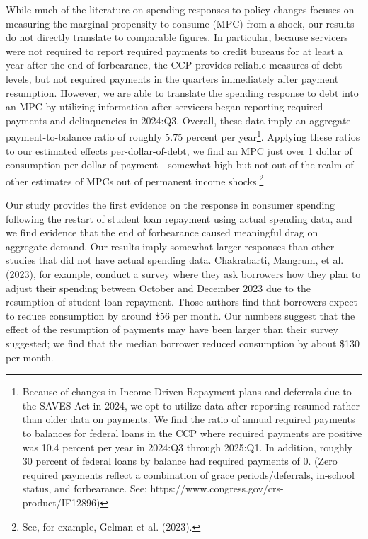 \documentclass[
  letterpaper,
  DIV=11,
  numbers=noendperiod]{scrartcl}
\begin{document}
While much of the literature on spending responses to policy changes
focuses on measuring the marginal propensity to consume (MPC) from a
shock, our results do not directly translate to comparable figures. In
particular, because servicers were not required to report required
payments to credit bureaus for at least a year after the end of
forbearance, the CCP provides reliable measures of debt levels, but not
required payments in the quarters immediately after payment resumption.
However, we are able to translate the spending response to debt into an
MPC by utilizing information after servicers began reporting required
payments and delinquencies in 2024:Q3. Overall, these data imply an
aggregate payment-to-balance ratio of roughly 5.75 percent per
year\footnote{Because of changes in Income Driven Repayment plans and
  deferrals due to the SAVES Act in 2024, we opt to utilize data after
  reporting resumed rather than older data on payments. We find the
  ratio of annual required payments to balances for federal loans in the
  CCP where required payments are positive was 10.4 percent per year in
  2024:Q3 through 2025:Q1. In addition, roughly 30 percent of federal
  loans by balance had required payments of 0. (Zero required payments
  reflect a combination of grace periods/deferrals, in-school status,
  and forbearance. See: https://www.congress.gov/crs-product/IF12896)}.
Applying these ratios to our estimated effects per-dollar-of-debt, we
find an MPC just over 1 dollar of consumption per dollar of
payment---somewhat high but not out of the realm of other estimates of
MPCs out of permanent income shocks.\footnote{See, for example, Gelman
  et al. (2023).}

Our study provides the first evidence on the response in consumer
spending following the restart of student loan repayment using actual
spending data, and we find evidence that the end of forbearance caused
meaningful drag on aggregate demand. Our results imply somewhat larger
responses than other studies that did not have actual spending data.
Chakrabarti, Mangrum, et al. (2023), for example, conduct a survey where
they ask borrowers how they plan to adjust their spending between
October and December 2023 due to the resumption of student loan
repayment. Those authors find that borrowers expect to reduce
consumption by around \$56 per month. Our numbers suggest that the
effect of the resumption of payments may have been larger than their
survey suggested; we find that the median borrower reduced consumption
by about \$130 per month.
\end{document}
